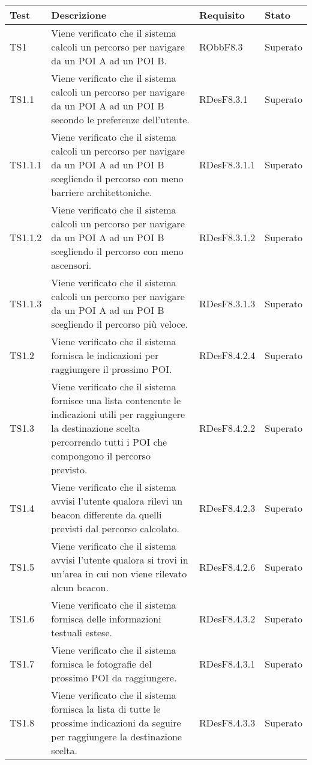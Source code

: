\documentclass[../PianoDiQualifica.tex]{subfiles}
\begin{document}
\begin{appendices}
	\begin{longtabu} to \textwidth {X[0.7] X[2] X[1.3] X}
\toprule
\textbf{Test} & \textbf{Descrizione} & \textbf{Requisito} & \textbf{Stato}\\
\midrule
\endhead
{}
TS1 & Viene verificato che il sistema calcoli un percorso per navigare da un POI A ad un POI B. & RObbF8.3 & Superato \\ 
\midrule 
TS1.1 & Viene verificato che il sistema calcoli un percorso per navigare da un POI A ad un POI B secondo le preferenze dell'utente. & RDesF8.3.1 & Superato \\ 
\midrule 
TS1.1.1 & Viene verificato che il sistema calcoli un percorso per navigare da un POI A ad un POI B scegliendo il percorso con meno barriere architettoniche. & RDesF8.3.1.1 & Superato \\ 
\midrule 
TS1.1.2 & Viene verificato che il sistema calcoli un percorso per navigare da un POI A ad un POI B scegliendo il percorso con meno ascensori. & RDesF8.3.1.2 & Superato \\ 
\midrule 
TS1.1.3 & Viene verificato che il sistema calcoli un percorso per navigare da un POI A ad un POI B scegliendo il percorso più veloce. & RDesF8.3.1.3 & Superato \\ 
\midrule 
TS1.2 & Viene verificato che il sistema fornisca le indicazioni per raggiungere il prossimo POI. & RDesF8.4.2.4 & Superato \\ 
\midrule 
TS1.3 & Viene verificato che il sistema fornisce una lista contenente le indicazioni utili per raggiungere la destinazione scelta percorrendo tutti i POI che compongono il percorso previsto. & RDesF8.4.2.2 & Superato \\ 
\midrule 
TS1.4 & Viene verificato che il sistema avvisi l'utente qualora rilevi un beacon differente da quelli previsti dal percorso calcolato. & RDesF8.4.2.3 & Superato \\ 
\midrule 
TS1.5 & Viene verificato che il sistema avvisi l'utente qualora si trovi in un'area in cui non viene rilevato alcun beacon. & RDesF8.4.2.6 & Superato \\ 
\midrule 
TS1.6 & Viene verificato che il sistema fornisca delle informazioni testuali estese. & RDesF8.4.3.2 & Superato \\ 
\midrule 
TS1.7 & Viene verificato che il sistema fornisca le fotografie del prossimo POI da raggiungere. & RDesF8.4.3.1 & Superato \\ 
\midrule 
TS1.8 & Viene verificato che il sistema fornisca la lista di tutte le prossime indicazioni da seguire per raggiungere la destinazione scelta. & RDesF8.4.3.3 & Superato \\ 

\end{longtabu}
\end{appendices}
\end{document}

